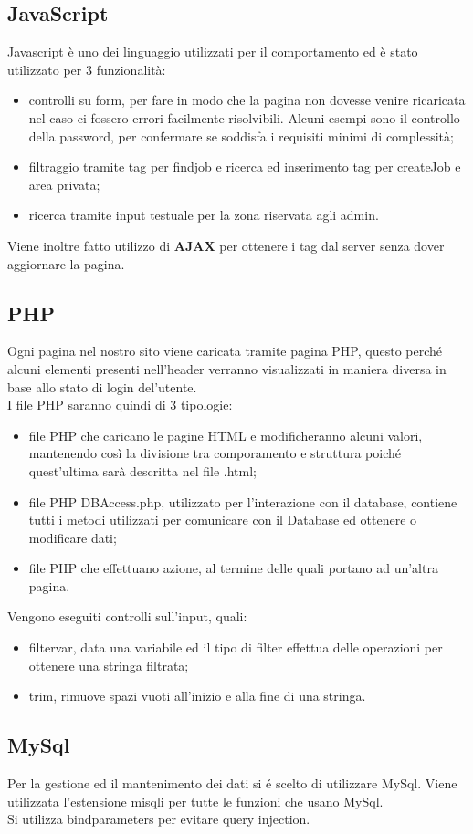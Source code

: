   \subsection{JavaScript}
  Javascript è uno dei linguaggio utilizzati per il comportamento ed è stato utilizzato per 3 funzionalità:
  \begin{itemize}
    \item controlli su form, per fare in modo che la pagina non dovesse venire ricaricata nel caso ci fossero errori facilmente risolvibili. Alcuni esempi sono il controllo della password, per confermare se soddisfa i requisiti minimi di complessità;
    \item filtraggio tramite tag per findjob e ricerca ed inserimento tag per createJob e area privata;
    \item ricerca tramite input testuale per la zona riservata agli admin.
  \end{itemize}
  
  Viene inoltre fatto utilizzo di \textbf{AJAX} per ottenere i tag dal server senza dover aggiornare la pagina.

  \subsection{PHP}
  Ogni pagina nel nostro sito viene caricata tramite pagina PHP, questo perché alcuni elementi presenti nell'header verranno visualizzati in maniera diversa in base allo stato di login del'utente. \\
  I file PHP saranno quindi di 3 tipologie:
  \begin{itemize}
    \item file PHP che caricano le pagine HTML e modificheranno alcuni valori, mantenendo così la divisione tra comporamento e struttura poiché quest'ultima sarà descritta nel file .html;
    \item file PHP DBAccess.php, utilizzato per l'interazione con il database, contiene tutti i metodi utilizzati per comunicare con il Database ed ottenere o modificare dati;
    \item file PHP che effettuano azione, al termine delle quali portano ad un'altra pagina.
  \end{itemize}

  Vengono eseguiti controlli sull'input, quali:
  \begin{itemize}
    \item filter\textunderscore var, data una variabile ed il tipo di filter effettua delle operazioni per ottenere una stringa filtrata;
    \item trim, rimuove spazi vuoti all'inizio e alla fine di una stringa.
  \end{itemize}

  \subsection{MySql}
  Per la gestione ed il mantenimento dei dati si é scelto di utilizzare MySql. Viene utilizzata l'estensione misqli per tutte le funzioni che usano MySql. \\
  Si utilizza bind\textunderscore parameters per evitare query injection.